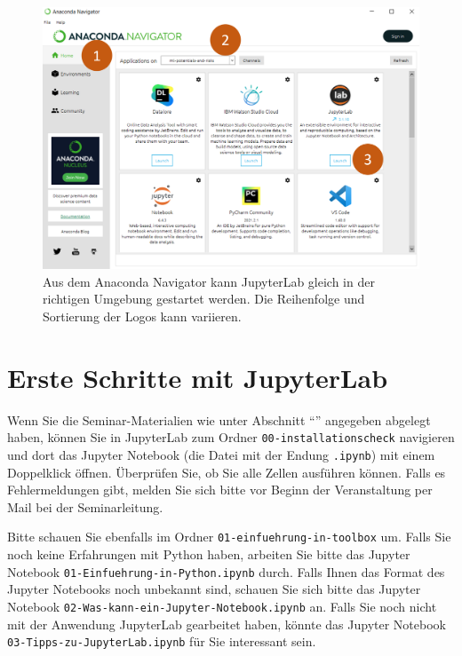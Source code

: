 \documentclass{tufte-handout}
\begin{document}
\begin{figure}[h]
  \includegraphics{anaconda-navigator-jupyterlab--mit-reihenfolge}
  \caption{Aus dem Anaconda Navigator kann JupyterLab gleich in der richtigen Umgebung gestartet werden.%
  Die Reihenfolge und Sortierung der Logos kann variieren.}%
\label{fig:start-jupyterlab}
\end{figure}

\section{Erste Schritte mit JupyterLab}

Wenn Sie die Seminar-Materialien wie unter Abschnitt \enquote{} angegeben abgelegt haben, 
können Sie in JupyterLab zum Ordner 
\texttt{00-installationscheck}
navigieren und dort das Jupyter Notebook (die Datei mit der Endung \texttt{.ipynb}) mit einem Doppelklick öffnen.
Überprüfen Sie, ob Sie alle Zellen ausführen können.
Falls es Fehlermeldungen gibt, melden Sie sich bitte vor Beginn der Veranstaltung per Mail bei der Seminarleitung.

Bitte schauen Sie ebenfalls im Ordner
\texttt{01-einfuehrung-in-toolbox}
um.
Falls Sie noch keine Erfahrungen mit Python haben, arbeiten Sie bitte das Jupyter Notebook
\texttt{01-Einfuehrung-in-Python.ipynb}
durch.
Falls Ihnen das Format des Jupyter Notebooks noch unbekannt sind, schauen Sie sich bitte das Jupyter Notebook
\texttt{02-Was-kann-ein-Jupyter-Notebook.ipynb}
an.
Falls Sie noch nicht mit der Anwendung JupyterLab gearbeitet haben, könnte das Jupyter Notebook \texttt{03-Tipps-zu-JupyterLab.ipynb} für Sie interessant sein.
\end{document}

